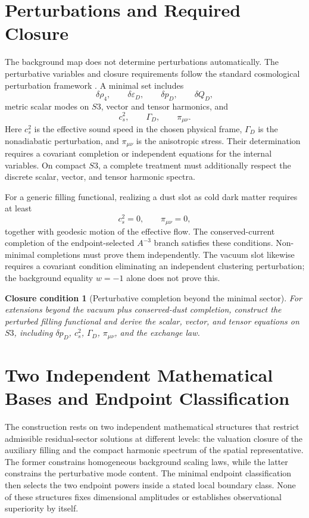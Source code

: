 \documentclass[11pt,a4paper]{article}
\def\Sthree{S3}%
\numberwithin{equation}{section}
\newtheorem{closurecondition}[criterion]{Closure condition}
\theoremstyle{remark}
\newcommand{\Sthree}{S^3}
\newcommand{\rhoFour}{\rho_4}
\newcommand{\epsD}{\varepsilon_D}
\newcommand{\pD}{p_D}
\newcommand{\QD}{Q_D}
\begin{document}
\section{Perturbations and Required Closure}
The background map does not determine perturbations automatically. The perturbative variables and closure requirements follow the standard cosmological perturbation framework \cite{KodamaSasaki1984,HalliwellHawking1985,MukhanovFeldmanBrandenberger1992,MalikWands2009}. A minimal set includes
\begin{equation}
\delta\rhoFour,
\qquad
\delta\epsD,
\qquad
\delta\pD,
\qquad
\delta\QD,
\end{equation}
metric scalar modes on \(\Sthree\), vector and tensor harmonics, and
\begin{equation}
c_s^2,
\qquad
\Gamma_D,
\qquad
\pi_{\mu\nu}.
\end{equation}
Here \(c_s^2\) is the effective sound speed in the chosen physical frame, \(\Gamma_D\) is the nonadiabatic perturbation, and \(\pi_{\mu\nu}\) is the anisotropic stress. Their determination requires a covariant completion or independent equations for the internal variables. On compact \(\Sthree\), a complete treatment must additionally respect the discrete scalar, vector, and tensor harmonic spectra.

For a generic filling functional, realizing a dust slot as cold dark matter requires at least
\begin{equation}
c_s^2=0,
\qquad
\pi_{\mu\nu}=0,
\end{equation}
together with geodesic motion of the effective flow. The conserved-current completion of the endpoint-selected \(A^{-3}\) branch satisfies these conditions. Non-minimal completions must prove them independently. The vacuum slot likewise requires a covariant condition eliminating an independent clustering perturbation; the background equality \(w=-1\) alone does not prove this.

\begin{closurecondition}[Perturbative completion beyond the minimal sector]
For extensions beyond the vacuum plus conserved-dust completion, construct the perturbed filling functional and derive the scalar, vector, and tensor equations on \(\Sthree\), including \(\delta\pD\), \(c_s^2\), \(\Gamma_D\), \(\pi_{\mu\nu}\), and the exchange law.
\end{closurecondition}



\section{Two Independent Mathematical Bases and Endpoint Classification}
The construction rests on two independent mathematical structures that restrict admissible residual-sector solutions at different levels: the valuation closure of the auxiliary filling and the compact harmonic spectrum of the spatial representative. The former constrains homogeneous background scaling laws, while the latter constrains the perturbative mode content. The minimal endpoint classification then selects the two endpoint powers inside a stated local boundary class. None of these structures fixes dimensional amplitudes or establishes observational superiority by itself.
\end{document}

